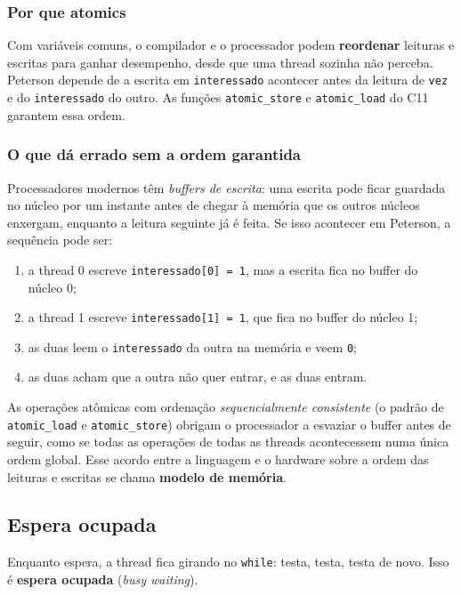 \documentclass[11pt,a4paper]{article}
\newcommand{\cmd}[1]{\texttt{#1}}
\begin{document}
\subsubsection{Por que atomics}
Com variáveis comuns, o compilador e o processador podem \textbf{reordenar} leituras e escritas para ganhar desempenho, desde que uma thread sozinha não perceba. Peterson depende de a escrita em \cmd{interessado} acontecer antes da leitura de \cmd{vez} e do \cmd{interessado} do outro. As funções \cmd{atomic\_store} e \cmd{atomic\_load} do C11 garantem essa ordem.

\subsubsection{O que dá errado sem a ordem garantida}
Processadores modernos têm \emph{buffers de escrita}: uma escrita pode ficar guardada no núcleo por um instante antes de chegar à memória que os outros núcleos enxergam, enquanto a leitura seguinte já é feita. Se isso acontecer em Peterson, a sequência pode ser:

\begin{enumerate}
    \item a thread 0 escreve \cmd{interessado[0] = 1}, mas a escrita fica no buffer do núcleo 0;
    \item a thread 1 escreve \cmd{interessado[1] = 1}, que fica no buffer do núcleo 1;
    \item as duas leem o \cmd{interessado} da outra na memória e veem \cmd{0};
    \item as duas acham que a outra não quer entrar, e as duas entram.
\end{enumerate}

As operações atômicas com ordenação \emph{sequencialmente consistente} (o padrão de \cmd{atomic\_load} e \cmd{atomic\_store}) obrigam o processador a esvaziar o buffer antes de seguir, como se todas as operações de todas as threads acontecessem numa única ordem global. Esse acordo entre a linguagem e o hardware sobre a ordem das leituras e escritas se chama \textbf{modelo de memória}.

\subsection{Espera ocupada}

Enquanto espera, a thread fica girando no \cmd{while}: testa, testa, testa de novo. Isso é \textbf{espera ocupada} (\emph{busy waiting}).
\end{document}
